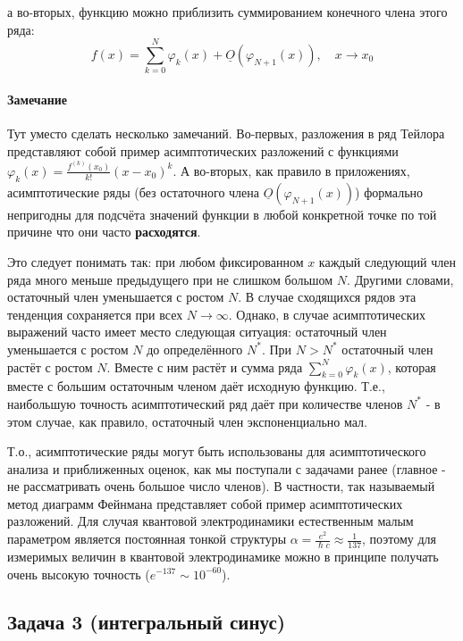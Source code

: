 \documentclass[a4paper,12pt]{article}
\begin{document}
\noindent
а во-вторых, функцию можно приблизить суммированием конечного члена
этого ряда:
\[
f(x)=\sum_{k=0}^{N}\varphi_{k}(x)+\underline{O}(\varphi_{N+1}(x)),\quad x\to x_{0}
\]



\paragraph{Замечание}

Тут уместо сделать несколько замечаний. Во-первых, разложения в ряд
Тейлора представляют собой пример асимптотических разложений с функциями
$\varphi_{k}(x)=\frac{f^{(k)}(x_{0})}{k!}(x-x_{0})^{k}$. А во-вторых,
как правило в приложениях, асимптотические ряды (без остаточного члена $\underline{O}(\varphi_{N+1}(x))$) формально непригодны
для подсчёта значений функции в любой конкретной точке по той причине что они часто \textbf{расходятся}. 

\vspace{5mm}
\noindent
Это следует понимать так: при любом фиксированном $x$ каждый следующий член ряда много меньше предыдущего при не слишком большом $N$. Другими словами, остаточный член уменьшается с ростом $N$. В случае сходящихся рядов эта тенденция сохраняется при всех $N\to\infty$. Однако, в случае асимптотических выражений часто имеет место следующая ситуация: остаточный член уменьшается с ростом $N$ до определённого $N^{*}$. При $N>N^{*}$ остаточный член растёт с ростом $N$. Вместе с ним растёт и сумма ряда $\sum_{k=0}^{N}\varphi_{k}(x)$, которая вместе с большим остаточным членом даёт исходную функцию. Т.е., наибольшую точность асимптотический ряд даёт при количестве членов $N^{*}$ - в этом случае, как правило, остаточный член экспоненциально мал.

\vspace{5mm}
\noindent
Т.о., асимптотические ряды могут быть использованы для асимптотического анализа и приближенных оценок, как
мы поступали с задачами ранее (главное - не рассматривать очень большое число членов). В частности, так называемый метод диаграмм Фейнмана представляет собой пример асимптотических разложений. Для случая квантовой электродинамики естественным малым параметром является постоянная тонкой структуры $\alpha=\frac{e^2}{\hslash c}\approx\frac{1}{137}$, поэтому для измеримых величин в квантовой электродинамике можно в принципе получать очень высокую точность ($e^{-137}\sim10^{-60}$).

\subsection*{Задача 3 (интегральный синус)}
\end{document}
